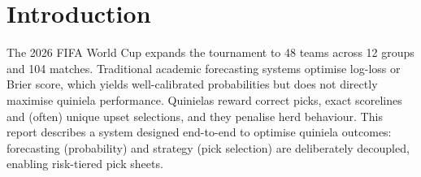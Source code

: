 \section{Introduction}
The 2026 FIFA World Cup expands the tournament to 48 teams across 12 groups
and 104 matches. Traditional academic forecasting systems optimise log-loss or
Brier score, which yields well-calibrated probabilities but does not directly
maximise quiniela performance. Quinielas reward correct picks, exact scorelines
and (often) unique upset selections, and they penalise herd behaviour. This
report describes a system designed end-to-end to optimise quiniela outcomes:
forecasting (probability) and strategy (pick selection) are deliberately
decoupled, enabling risk-tiered pick sheets.
